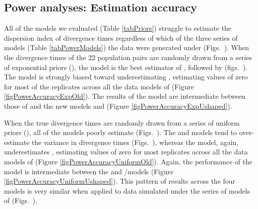 \documentclass[letterpaper,12pt]{article}
\begin{document}
\begin{linenumbers}
\subsection*{Power analyses: Estimation accuracy}
All of the models we evaluated (Table \ref{tabPriors}) struggle to estimate the
dispersion index of divergence times \divTimeDispersion regardless of which of
the three series of models (Table \ref{tabPowerModels}) the data were generated
under (Figs.\
).
When the divergence times of the 22 population pairs are randomly drawn from a
series of exponential priors (\powerSeriesExp), the \modelDPP model is the
best estimator of \divTimeDispersion, followed by \modelUniform (figs.\
).
The \modelOld model is strongly biased toward underestimating
\divTimeDispersion, estimating values of zero for most of the replicates across
all the data models of \powerSeriesExp (Figure \ref{figPowerAccuracyExpOld}).
The results of the \modelUshaped model are intermediate between those of
\modelOld and the new models \modelDPP and \modelUniform
(Figure \ref{figPowerAccuracyExpUshaped}).

When the true divergence times are randomly drawn from a series of uniform
priors (\powerSeriesUniform), all of the models poorly estimate
\divTimeDispersion (Figs.\
).
The \modelDPP and \modelUniform models tend to over-estimate the variance in
divergence times (Figs.\
), whereas
the \modelOld model, again, underestimates \divTimeDispersion, estimating
values of zero for most replicates across all the data models of
\powerSeriesUniform (Figure \ref{figPowerAccuracyUniformOld}).
Again, the performance of the \modelUshaped model is intermediate between the
\modelOld and \modelDPP/\modelUniform models (Figure
\ref{figPowerAccuracyUniformUshaped}).
This pattern of results across the four models is very similar when applied
to data simulated under the series of models of \powerSeriesOld (Figs.\
).


\end{linenumbers}
\end{document}
